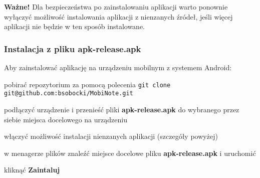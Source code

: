 \documentclass[shortabstract]{iithesis}
\begin{document}
\textbf{Ważne!} Dla bezpieczeństwa po zainstalowaniu aplikacji warto ponownie wyłączyć możliwość instalowania aplikacji z nienzanych źródeł, jeśli więcej aplikacji nie będzie w ten sposób instalowane.

\subsubsection{Instalacja z pliku apk-release.apk}

Aby zainstalować aplikację na urządzeniu mobilnym z systemem Android:

\begin{compactitem}
    \setlength\itemsep{0mm}
    \item pobirać repozytorium za pomocą polecenia
    \newline
    \verb|git clone git@github.com:bsobocki/MobiNote.git|
    \item podłączyć urządzenie i przenieść pliki \textbf{apk-release.apk} do wybranego przez siebie miejsca docelowego na urządzeniu
    \item włączyć możliwość instalacji nienzanych aplikacji (szczegóły powyżej)
    \item w menagerze plików znaleźć miejsce docelowe pliku \textbf{apk-release.apk} i uruchomić
    \item kliknąć \textbf{Zaintaluj}
\end{compactitem}








\end{document}
